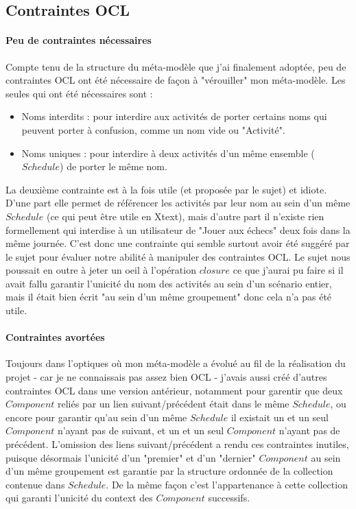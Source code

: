 \documentclass[12pt]{article}
\begin{document}
\subsection{Contraintes OCL}
\paragraph{Peu de contraintes nécessaires}
Compte tenu de la structure du méta-modèle que j'ai finalement adoptée, peu de contraintes OCL ont été nécessaire de façon à "vérouiller" mon méta-modèle. Les seules qui ont été nécessaires sont :
\begin{itemize}
	\item Noms interdits : pour interdire aux activités de porter certains noms qui peuvent porter à confusion, comme un nom vide ou "Activité".
	\item Noms uniques : pour interdire à deux activités d'un même ensemble ($Schedule$) de porter le même nom.
\end{itemize}
La deuxième contrainte est à la fois utile (et proposée par le sujet) et idiote. D'une part elle permet de référencer les activités par leur nom au sein d'un même $Schedule$ (ce qui peut être utile en Xtext), mais d'autre part il n'existe rien formellement qui interdise à un utilisateur de "Jouer aux échecs" deux fois dans la même journée. C'est donc une contrainte qui semble surtout avoir été suggéré par le sujet pour évaluer notre abilité à manipuler des contraintes OCL. Le sujet nous poussait en outre à jeter un oeil à l'opération $closure$ ce que j'aurai pu faire si il avait fallu garantir l'unicité du nom des activités au sein d'un scénario entier, mais il était bien écrit "au sein d'un même groupement" donc cela n'a pas été utile.

\paragraph{Contraintes avortées}
Toujours dans l'optiques où mon méta-modèle a évolué au fil de la réalisation du projet - car je ne connaissais pas assez bien OCL - j'avais aussi créé d'autres contraintes OCL dans une version antérieur, notamment pour garentir que deux $Component$ reliés par un lien suivant/précédent était dans le même $Schedule$, ou encore pour garantir qu'au sein d'un même $Schedule$ il existait un et un seul $Component$ n'ayant pas de suivant, et un et un seul $Component$ n'ayant pas de précédent. L'omission des liens suivant/précédent a rendu ces contraintes inutiles, puisque désormais l'unicité d'un "premier" et d'un "dernier" $Component$ au sein d'un même groupement est garantie par la structure ordonnée de la collection contenue dans $Schedule$. De la même façon c'est l'appartenance à cette collection qui garanti l'unicité du context des $Component$ successifs.
\end{document}
